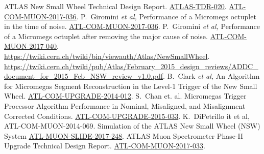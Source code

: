 \begin{thebibliography}{99}
\label{bibliography}
\setlength{\itemsep}{1.5pt plus 2.0pt minus 1.4pt}
\setlength{\parsep}{0pt}
\setlength{\parskip}{0pt}
\vspace{-6pt}
 ATLAS New Small Wheel Technical Design Report. \href{http://cds.cern.ch/record/1552862}{\color{blue}\underline{ATLAS-TDR-020}}.
 \href{https://cds.cern.ch/record/2272355}{\color{blue}\underline{ATL-COM-MUON-2017-036}}.
 P.~Giromini {\it et al,} Performance of a Micromegs octuplet in the time  of noise.
 \href{https://cds.cern.ch/record/2277316}{\color{blue}\underline{ATL-COM-MUON-2017-036}}.
 P.~Giromini  {\it et al,} Performance of a Micromegs octuplet after removing the major cause of noise.
 \href{https://cds.cern.ch/record/2277316}{\color{blue}\underline{ATL-COM-MUON-2017-040}}.
 \url{https://twiki.cern.ch/twiki/bin/viewauth/Atlas/NewSmallWheel}.
 \url{https://twiki.cern.ch/twiki/pub/Atlas/February_2015_design_reviews/ADDC_document_for_2015_Feb_NSW_review_v1.0.pdf}.
 B.~Clark {\it et al,} An Algorithm for Micromegas Segment
 Reconstruction in the Level-1 Trigger of the New Small Wheel. \href{https://cds.cern.ch/record/1706160}{\color{blue}\underline{ATL-COM-UPGRADE-2014-012}}.
 S.~Chan et. al. Micromegas Trigger Processor Algorithm Performance in Nominal, Misaligned, and Misalignment
 Corrected Conditions. \href{https://cds.cern.ch/record/2113121}{\color{blue}\underline{ATL-COM-UPGRADE-2015-033}}.
 K.~DiPetrillo  {it et al,} ATL-COM-MUON-2014-069.
 Simulation of the ATLAS New Small Wheel (NSW) System
 \href{http://cds.cern.ch/record/2265067}{\color{blue}\underline{ATL-MUON-SLIDE-2017-248}}.
 ATLAS Muon Spectrometer Phase-II Upgrade Technical Design Report. \href{https://cds.cern.ch/record/2270169/}{\color{blue}\underline{ATL-COM-MUON-2017-033}}.
\end{thebibliography}








